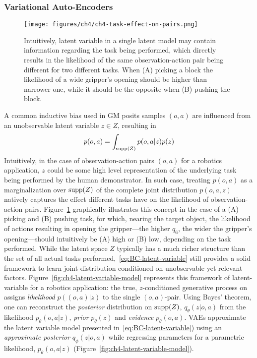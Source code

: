\subsubsection{Variational Auto-Encoders}

\begin{figure}
    \centering
    \texttt{[image: figures/ch4/ch4-task-effect-on-pairs.png]}
    \caption{Intuitively, latent variable in a single latent model may contain information regarding the task being performed, which directly results in the likelihood of the same observation-action pair being different for two different tasks. When (A) picking a block the likelihood of a wide gripper's opening should be higher than narrower one, while it should be the opposite when (B) pushing the block.}
    \label{fig:ch4-task-effect-on-pairs}
\end{figure}

A common inductive bias used in GM posits samples \( (o,a) \) are influenced from an unobservable latent variable \( z \in Z \), resulting in
\begin{equation}\label{eq:BC-latent-variable}
    p (o,a) = \int_{\text{supp}({Z})} p(o,a \vert z) p(z)
\end{equation}
Intuitively, in the case of observation-action pairs \( (o, a) \) for a robotics application, \( z \) could be some high level representation of the underlying task being performed by the human demonstrator.
In such case, treating \( p(o,a) \) as a marginalization over \( \text{supp}({Z}) \) of the complete joint distribution \( p(o,a,z) \) natively captures the effect different tasks have on the likelihood of observation-action pairs.
Figure~\ref{fig:ch4-task-effect-on-pairs} graphically illustrates this concept in the case of a (A) picking and (B) pushing task, for which, nearing the target object, the likelihood of actions resulting in opening the gripper---the higher \( q_6 \), the wider the gripper's opening---should intuitively be (A) high or (B) low, depending on the task performed.
While the latent space \( Z \) typically has a much richer structure than the set of all actual tasks performed,~\ref{eq:BC-latent-variable} still provides a solid framework to learn joint distribution conditioned on unobservable yet relevant factors.
Figure~\ref{fig:ch4-latent-variable-model} represents this framework of latent-variable for a robotics application: the true, \( z \)-conditioned generative process on assigns \emph{likelihood} \( p((o,a) \vert z) \) to the single \( (o,a) \)-pair.
Using Bayes' theorem, one can reconstruct the \emph{posterior} distribution on \( \text{supp}({Z}) \), \( q_\theta(z \vert o,a) \) from the likelihood \( p_\theta(o,a \vert z) \), \emph{prior} \( p_\theta(z) \) and \emph{evidence} \( p_\theta(o,a) \).
VAEs approximate the latent variable model presented in~\ref{eq:BC-latent-variable}) using an \emph{approximate posterior} \(q_\phi(z \vert o,a) \) while regressing parameters for a parametric likelihood, \( p_\theta(o,a \vert z) \) (Figure~\ref{fig:ch4-latent-variable-model}).

